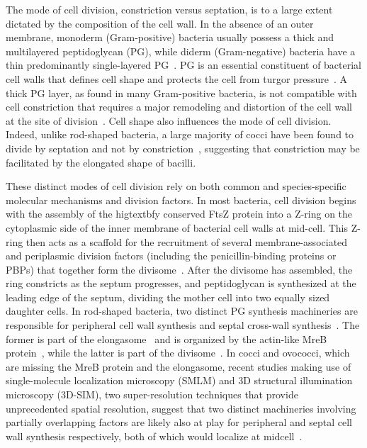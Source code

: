 The mode of cell division, constriction versus septation, is to a large extent dictated by the composition of the cell wall.
In the absence of an outer membrane, monoderm (Gram-positive) bacteria usually possess a thick and multilayered peptidoglycan (PG), while diderm (Gram-negative) bacteria have a thin predominantly single-layered PG~\cite{}.
PG is an essential constituent of bacterial cell walls that defines cell shape and protects the cell from turgor pressure~\cite{gardePeptidoglycanStructureSynthesis2021}.
A thick PG layer, as found in many Gram-positive bacteria, is not compatible with cell constriction that requires a major remodeling and distortion of the cell wall at the site of division~\cite{nguyenSimulationsSuggestConstrictive2019}.
Cell shape also influences the mode of cell division.
Indeed, unlike rod-shaped bacteria, a large majority of cocci have been found to divide by septation and not by constriction~\cite{zapunDifferentShapesCocci2008,pinhoHowGetMechanisms2013}, suggesting that constriction may be facilitated by the elongated shape of bacilli.

These distinct modes of cell division rely on both common and species-specific molecular mechanisms and division factors.
In most bacteria, cell division begins with the assembly of the higtextbfy conserved FtsZ protein into a Z-ring on the cytoplasmic side of the inner membrane of bacterial cell walls at mid-cell.
This Z-ring then acts as a scaffold for the recruitment of several membrane-associated and periplasmic division factors (including the penicillin-binding proteins or PBPs) that together form the divisome~\cite{pinhoHowGetMechanisms2013}.
After the divisome has assembled, the ring constricts as the septum progresses, and peptidoglycan is synthesized at the leading edge of the septum, dividing the mother cell into two equally sized daughter cells.
In rod-shaped bacteria, two distinct PG synthesis machineries are responsible for peripheral cell wall synthesis and septal cross-wall synthesis~\cite{eganRegulationPeptidoglycanSynthesis2020}.
The former is part of the elongasome~\cite{eganRegulationPeptidoglycanSynthesis2020} and is organized by the actin-like MreB protein~\cite{eganRegulationBacterialCell2017}, while the latter is part of the divisome~\cite{duAssemblyActivationEscherichia2017,denblaauwenDivisome25Road2017}.
In cocci and ovococci, which are missing the MreB protein and the elongasome, recent studies making use of single-molecule localization microscopy (SMLM) and 3D structural illumination microscopy (3D-SIM), two super-resolution techniques that provide unprecedented spatial resolution, suggest that two distinct machineries involving partially overlapping factors are likely also at play for peripheral and septal cell wall synthesis respectively, both of which would localize at midcell~\cite{pinhoHowGetMechanisms2013,trouveNanoscaleDynamicsPeptidoglycan2021,perezOrganizationPeptidoglycanSynthesis2021,perez-nunezNewMorphogenesisPathway2011,lundMolecularCoordinationStaphylococcus2018}.

